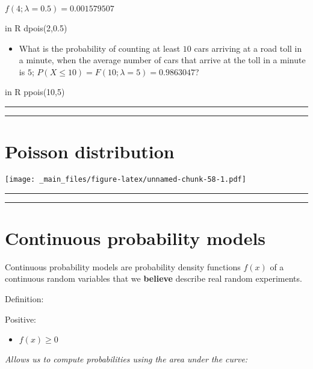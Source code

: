 \documentclass[
]{book}
\providecommand{\tightlist}{%
  \setlength{\itemsep}{0pt}\setlength{\parskip}{0pt}}
\begin{document}
\(f(4; \lambda=0.5)=0.001579507\)

in R dpois(2,0.5)

\begin{itemize}
\tightlist
\item
  What is the probability of counting at least \(10\) cars arriving at a road toll in a minute, when the average number of cars that arrive at the toll in a minute is \(5\);
  \(P(X \leq 10)=F(10; \lambda=5)=0.9863047\)?
\end{itemize}

in R ppois(10,5)

\begin{center}\rule{0.5\linewidth}{0.5pt}\end{center}

\begin{center}\rule{0.5\linewidth}{0.5pt}\end{center}

\hypertarget{poisson-distribution-5}{%
\section{Poisson distribution}\label{poisson-distribution-5}}

\texttt{[image: \_main\_files/figure-latex/unnamed-chunk-58-1.pdf]}

\begin{center}\rule{0.5\linewidth}{0.5pt}\end{center}

\begin{center}\rule{0.5\linewidth}{0.5pt}\end{center}

\hypertarget{continuous-probability-models}{%
\section{Continuous probability models}\label{continuous-probability-models}}

Continuous probability models are probability density functions \(f(x)\) of a continuous random variables that we \textbf{believe} describe real random experiments.

Definition:

Positive:

\begin{itemize}
\tightlist
\item
  \(f(x) \geq 0\)
\end{itemize}

\emph{Allows us to compute probabilities using the area under the curve:}
\end{document}

